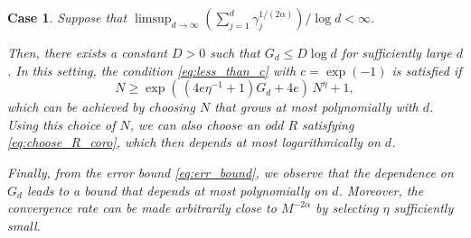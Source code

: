\documentclass[pdflatex,sn-basic,Numbered]{sn-jnl}%
\theoremstyle{thmstyleone}%
\theoremstyle{thmstyletwo}%
\newtheorem{case}{Case}
\begin{document}
\begin{case}
Suppose that ${\displaystyle \limsup_{d\to\infty} \left(\sum_{j=1}^d \gamma_j^{1/(2\alpha)}\right)/\log d < \infty}$.

Then, there exists a constant $D > 0$ such that $G_d \le D \log d$ for sufficiently large $d$. 
In this setting, the condition \eqref{eq:less_than_c} with $c = \exp(-1)$ is satisfied if
\[
 N \ge \exp\left(\, (4e\eta^{-1}+1)G_d+4e\right) \, N^\eta+1,
\]
which can be achieved by choosing $N$ that grows at most polynomially with $d$. Using this choice of $N$, we can also choose an odd $R$ satisfying \eqref{eq:choose_R_coro}, which then depends at most logarithmically on $d$.

Finally, from the error bound \eqref{eq:err_bound}, we observe that the dependence on $G_d$ leads to a bound that depends at most polynomially on $d$. Moreover, the convergence rate can be made arbitrarily close to $M^{-2\alpha}$ by selecting $\eta$ sufficiently small.
\end{case}
\end{document}
